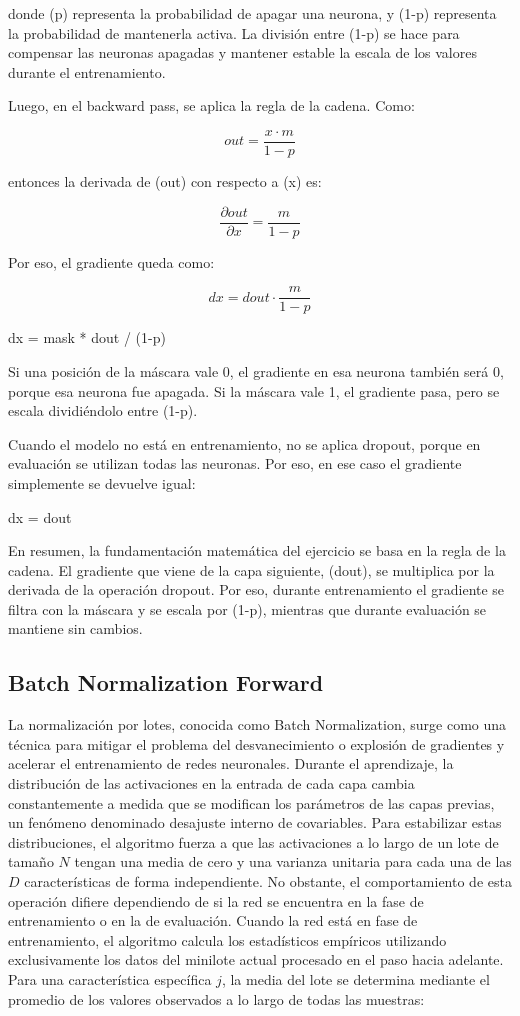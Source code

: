 \documentclass[12pt]{article}
\begin{document}
donde (p) representa la probabilidad de apagar una neurona, y (1-p) representa la probabilidad de 
mantenerla activa. La división entre (1-p) se hace para compensar las neuronas apagadas y mantener estable 
la escala de los valores durante el entrenamiento.

Luego, en el backward pass, se aplica la regla de la cadena. Como:

$$
out = \frac{x \cdot m}{1-p}
$$

entonces la derivada de (out) con respecto a (x) es:

$$
\frac{\partial out}{\partial x} = \frac{m}{1-p}
$$

Por eso, el gradiente queda como:

$$
dx = dout \cdot \frac{m}{1-p}
$$

dx = mask * dout / (1-p)

Si una posición de la máscara vale 0, el gradiente en esa neurona también será 0, porque esa neurona fue apagada. 
Si la máscara vale 1, el gradiente pasa, pero se escala dividiéndolo entre (1-p).

Cuando el modelo no está en entrenamiento, no se aplica dropout, porque en evaluación se utilizan todas las neuronas. 
Por eso, en ese caso el gradiente simplemente se devuelve igual:

dx = dout

En resumen, la fundamentación matemática del ejercicio se basa en la regla de la cadena. El gradiente que viene de la capa 
siguiente, (dout), se multiplica por la derivada de la operación dropout. Por eso, durante entrenamiento el gradiente se 
filtra con la máscara y se escala por (1-p), mientras que durante evaluación se mantiene sin cambios.

\subsection{Batch Normalization Forward}

La normalización por lotes, conocida como Batch Normalization, surge como una técnica 
para mitigar el problema del desvanecimiento o explosión de gradientes y acelerar el 
entrenamiento de redes neuronales. Durante el aprendizaje, la distribución de las activaciones 
en la entrada de cada capa cambia constantemente a medida que se modifican los parámetros de 
las capas previas, un fenómeno denominado desajuste interno de covariables. Para estabilizar 
estas distribuciones, el algoritmo fuerza a que las activaciones a lo largo de un lote de 
tamaño $N$ tengan una media de cero y una varianza unitaria para cada una de las $D$ 
características de forma independiente. No obstante, el comportamiento de esta operación 
difiere dependiendo de si la red se encuentra en la fase de entrenamiento o en la de 
evaluación. Cuando la red está en fase de entrenamiento, el algoritmo calcula los 
estadísticos empíricos utilizando exclusivamente los datos del minilote actual procesado 
en el paso hacia adelante. Para una característica específica $j$, la media del lote se 
determina mediante el promedio de los valores observados a lo largo de todas las muestras:
\end{document}
